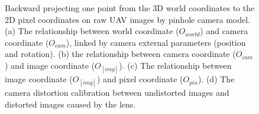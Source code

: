 \begin{figure}[htb]
  \begin{center}
  \end{center}
  \caption[Backward projection illustration graph]{
     Backward projecting one point from the 3D world coordinates to the 2D pixel coordinates on raw UAV images by pinhole camera model. (a) The relationship between world coordinate ($O_{world}$) and camera coordinate ($O_{cam}$), linked by camera external parameters (position and rotation). (b) the relationship between camera coordinate ($O_{cam}$) and image coordinate ($O_[img]$). (c) The relationship between image coordinate ($O_[img]$) and pixel coordinate ($O_{pix}$). (d) The camera distortion calibration between undistorted images and distorted images caused by the lens.
  }
  \label{fig:idps1}
\end{figure}